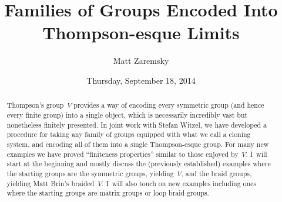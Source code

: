 \documentclass{UAmathtalk}
\author{Matt Zaremsky}
\title{Families of Groups Encoded Into Thompson-esque Limits}
\date{Thursday, September 18, 2014}
\begin{document}
\maketitle

\begin{abstract}
Thompson's group~$V$ provides a way of encoding every symmetric group (and hence every finite group) into a single object, which is necessarily incredibly vast but nonetheless finitely presented.
In joint work with Stefan Witzel, we have developed a procedure for taking any family of groups equipped with what we call a cloning system, and encoding all of them into a single Thompson-esque group.
For many new examples we have proved ``finiteness properties'' similar to those enjoyed by~$V$.
I~will start at the beginning and mostly discuss the (previously established) examples where the starting groups are the symmetric groups, yielding~$V$, and the braid groups, yielding Matt Brin's braided~$V$.
I~will also touch on new examples including ones where the starting groups are matrix groups or loop braid groups.
\end{abstract}
\end{document}
